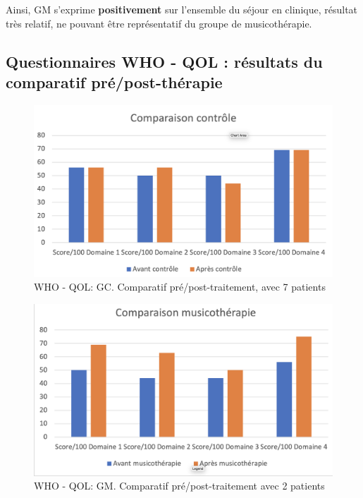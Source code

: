                  Ainsi,  GM s'exprime
                 \textbf{positivement}
                 sur l'ensemble du séjour en clinique, résultat très relatif, ne pouvant être  représentatif du 
                 groupe de 
                 musicothérapie.

                 \subsection{Questionnaires WHO - QOL : résultats du comparatif pré/post-thérapie}



\begin{figure}
\centering
\includegraphics[width=\linewidth]{images/Compcontrole.png}
\caption[Schéma du déroulement]{WHO - QOL:  GC. Comparatif pré/post-traitement, avec 7 patients}

\end{figure}

\begin{figure}
\centering
\includegraphics[width=1.0\linewidth]{images/Compmusico.png}
\caption[Schéma du déroulement]{ WHO -  QOL: GM. Comparatif pré/post-traitement avec 2 patients}

\end{figure}


